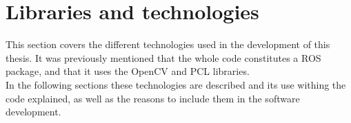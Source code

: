 \newpage
\section{Libraries and technologies}
\label{libraries_and_technologies}

This section covers the different technologies used in the development of this thesis. It was previously mentioned that the whole code constitutes a ROS package, and that it uses the OpenCV and PCL libraries. 
\\

In the following sections these technologies are described and its use withing the code explained, as well as the reasons to include them in the software development. 

% 
% 
% 

% 

% 
